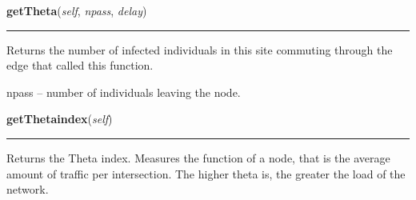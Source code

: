     \label{Epigrass:simobj:siteobj:getTheta}

    \vspace{0.5ex}

    \begin{boxedminipage}{\textwidth}

    \raggedright \textbf{getTheta}(\textit{self}, \textit{npass}, \textit{delay})

    \vspace{-1.5ex}

    \rule{\textwidth}{0.5\fboxrule}
    Returns the number of infected individuals in this site commuting 
    through the edge that called this function.

    npass -- number of individuals leaving the node.

    \vspace{1ex}

    \end{boxedminipage}

    \label{Epigrass:simobj:siteobj:getThetaindex}

    \vspace{0.5ex}

    \begin{boxedminipage}{\textwidth}

    \raggedright \textbf{getThetaindex}(\textit{self})

    \vspace{-1.5ex}

    \rule{\textwidth}{0.5\fboxrule}
    Returns the Theta index. Measures the function of a node, that is the 
    average amount of traffic per intersection. The higher theta is, the 
    greater the load of the network.

    \vspace{1ex}

    \end{boxedminipage}

    \label{Epigrass:simobj:siteobj:receiveTheta}

    \vspace{0.5ex}

